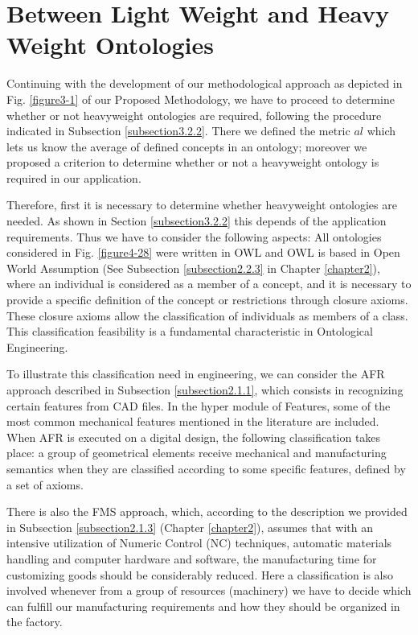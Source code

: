 \section{Between Light Weight and Heavy Weight Ontologies}\label{section4.3}


Continuing with the development of our methodological approach as depicted in Fig. \ref{figure3-1} of our Proposed Methodology, we have to proceed to determine whether or not heavyweight ontologies are required, following the procedure indicated in Subsection \ref{subsection3.2.2}. There we defined the metric $al$ which lets us know the average of defined concepts in an ontology; moreover we proposed a criterion to determine whether or not a heavyweight ontology is required in our application. 

Therefore, first it is necessary to determine whether heavyweight ontologies are needed. As shown in Section \ref{subsection3.2.2} this depends of the application requirements. Thus we have to consider the following aspects: All ontologies considered in Fig. \ref{figure4-28} were written in  OWL and OWL is based in Open World Assumption   (See Subsection \ref{subsection2.2.3} in Chapter \ref{chapter2}), where an individual is considered as a member of a concept, and it is necessary to provide a specific definition of the concept or restrictions through  closure axioms. These closure axioms allow the classification of individuals as members of a class.     This classification feasibility is a fundamental characteristic in Ontological Engineering.  

To illustrate this classification need in engineering, we can   consider the AFR approach described in Subsection \ref{subsection2.1.1}, which consists in recognizing certain features from CAD files. In the hyper module of Features, some of the most common mechanical features mentioned in the literature are included. When AFR is executed on a digital design, the following classification takes place: a group of geometrical elements receive mechanical and manufacturing semantics when they are classified according to some specific features, defined by a set of axioms. 

There is also the FMS approach, which, according to the description we provided in Subsection \ref{subsection2.1.3} (Chapter \ref{chapter2}), assumes that with an intensive utilization of Numeric Control (NC) techniques, automatic materials handling and computer hardware and software, the manufacturing time for customizing goods should be considerably reduced. Here a classification is also involved whenever from a group of resources (machinery) we have to decide which can fulfill our manufacturing requirements   and how they should be organized in the factory. 

